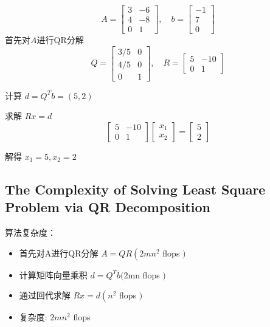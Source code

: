 \begin{example}
    $$
A=\left[\begin{array}{cc}
3 & -6 \\
4 & -8 \\
0 & 1
\end{array}\right], \quad b=\left[\begin{array}{c}
-1 \\
7 \\
0
\end{array}\right]
$$
首先对$A$进行QR分解
$$
Q=\left[\begin{array}{cc}
3 / 5 & 0 \\
4 / 5 & 0 \\
0 & 1
\end{array}\right], \quad R=\left[\begin{array}{cc}
5 & -10 \\
0 & 1
\end{array}\right]
$$

计算 $ d=Q^{T} b=(5,2) $

求解 $ R x=d $
$$
\left[\begin{array}{cc}
5 & -10 \\
0 & 1
\end{array}\right]\left[\begin{array}{l}
x_{1} \\
x_{2}
\end{array}\right]=\left[\begin{array}{l}
5 \\
2
\end{array}\right]
$$

解得 $ x_{1}=5, x_{2}=2 $

\end{example}


\subsection{The Complexity of Solving Least Square Problem via QR Decomposition}

算法复杂度：

\begin{itemize}
    \item 首先对A进行QR分解 $ A=Q R\left(2 m n^{2}\right. $ flops $ ) $
    \item 计算矩阵向量乘积 $ d=Q^{T} b(2 \mathrm{mn} $ flops $ ) $
    \item 通过回代求解 $ R x=d\left(n^{2}\right. $ flops $ ) $
    \item 复杂度: $ 2 m n^{2} $ flops
\end{itemize}



